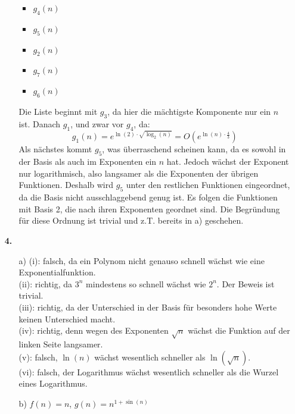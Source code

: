 \documentclass[a4paper,11pt]{article}
\begin{document}
\begin{enumerate}
\begin{enumerate}
\begin{itemize}
                            \item $g_4(n)$\\
                            \item $g_5(n)$\\
                            \item $g_2(n)$\\
                            \item $g_7(n)$\\
                            \item $g_6(n)$\\
                        \end{itemize}
                        Die Liste beginnt mit $g_3$, da hier die mächtigste Komponente
                        nur ein $n$ ist. Danach $g_1$, und zwar vor $g_4$, da:
                        \[ g_1(n)=e^{\ln(2) \cdot \sqrt{\log_2(n)}}=O(e^{\ln(n) \cdot \frac{4}{3}}) \]
                        Als nächstes kommt $g_5$, was überraschend scheinen kann, da es sowohl
                        in der Basis als auch im Exponenten ein $n$ hat. Jedoch
                        wächst der Exponent nur logarithmisch, also langsamer
                        als die Exponenten der übrigen Funktionen. Deshalb 
                        wird $g_5$ unter den restlichen Funktionen eingeordnet,
                        da die Basis nicht ausschlaggebend genug ist.
                        Es folgen die Funktionen mit Basis 2, die nach 
                        ihren Exponenten geordnet sind. Die Begründung für diese
                        Ordnung ist trivial und z.T. bereits in a) geschehen.
                \end{enumerate}

            \item[\textbf{4.}]
                \begin{enumerate}
                    \item[a)]
                        (i): falsch, da ein Polynom nicht genauso schnell wächst
                        wie eine Exponentialfunktion.\\
                        (ii): richtig, da $3^n$ mindestens so schnell wächst wie
                        $2^n$. Der Beweis ist trivial.\\
                        (iii): richtig, da der Unterschied in der Basis für 
                        besonders hohe Werte keinen Unterschied macht.\\
                        (iv): richtig, denn wegen des Exponenten $\sqrt{n}$
                        wächst die Funktion auf der linken Seite langsamer.\\
                        (v): falsch, $\ln(n)$ wächst wesentlich schneller als
                        $\ln(\sqrt{n})$.\\
                        (vi): falsch, der Logarithmus wächst wesentlich
                        schneller als die Wurzel eines Logarithmus.
                    \item[b)]
                        $f(n)=n$, $g(n)=n^{1+\sin(n)}$
                \end{enumerate}

    \end{enumerate}
\end{document}
